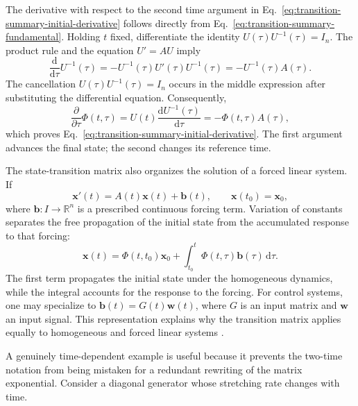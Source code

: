 \documentclass[11pt,a4paper]{article}
\newcommand{\be}{\begin{equation}}
\newcommand{\ee}{\end{equation}}
\newcommand{\lb}[1]{\label{#1}}
\newcommand{\dd}{\mathrm{d}}
\newcommand{\R}{\mathbb{R}}
\theoremstyle{definition}
\numberwithin{equation}{section}
\begin{document}
The derivative with respect to the second time argument in Eq.~\eqref{eq:transition-summary-initial-derivative} follows directly from Eq.~\eqref{eq:transition-summary-fundamental}. Holding $t$ fixed, differentiate the identity $U(\tau)U^{-1}(\tau)=I_n$. The product rule and the equation $U'=AU$ imply
\be
\frac{\dd}{\dd\tau}U^{-1}(\tau)
=-U^{-1}(\tau)U'(\tau)U^{-1}(\tau)
=-U^{-1}(\tau)A(\tau).
\lb{eq:transition-inverse-correct}
\ee
The cancellation $U(\tau)U^{-1}(\tau)=I_n$ occurs in the middle expression after substituting the differential equation. Consequently,
\be
\frac{\partial}{\partial\tau}\Phi(t,\tau)
=U(t)\frac{\dd U^{-1}(\tau)}{\dd\tau}
=-\Phi(t,\tau)A(\tau),
\lb{eq:transition-initial-derivative-proof}
\ee
which proves Eq.~\eqref{eq:transition-summary-initial-derivative}. The first argument advances the final state; the second changes its reference time.

The state-transition matrix also organizes the solution of a forced linear system. If
\be
\mathbf{x}'(t)=A(t)\mathbf{x}(t)+\mathbf{b}(t),
\qquad
\mathbf{x}(t_0)=\mathbf{x}_0,
\lb{eq:forced-linear-system}
\ee
where $\mathbf b:I\to\R^n$ is a prescribed continuous forcing term. Variation of constants separates the free propagation of the initial state from the accumulated response to that forcing:
\be
\mathbf{x}(t)
=\Phi(t,t_0)\mathbf{x}_0
+\int_{t_0}^{t}\Phi(t,\tau)\mathbf{b}(\tau)\,\dd\tau.
\lb{eq:forced-transition-solution}
\ee
The first term propagates the initial state under the homogeneous dynamics, while the integral accounts for the response to the forcing. For control systems, one may specialize to $\mathbf b(t)=G(t)\mathbf w(t)$, where $G$ is an input matrix and $\mathbf w$ an input signal. This representation explains why the transition matrix applies equally to homogeneous and forced linear systems \cite{rugh1996,brockett1970}.

A genuinely time-dependent example is useful because it prevents the two-time notation from being mistaken for a redundant rewriting of the matrix exponential. Consider a diagonal generator whose stretching rate changes with time.
\end{document}
